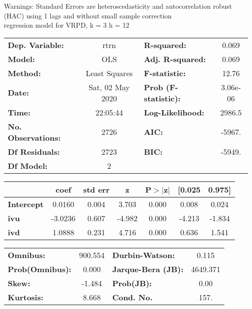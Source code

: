 Warnings: \newline
 [1] Standard Errors are heteroscedasticity and autocorrelation robust (HAC) using 1 lags and without small sample correction\\ 

regression model for VRPD, k = 3 h = 12\begin{center}
\begin{tabular}{lclc}
\toprule
\textbf{Dep. Variable:}    &       rtrn       & \textbf{  R-squared:         } &     0.069   \\
\textbf{Model:}            &       OLS        & \textbf{  Adj. R-squared:    } &     0.069   \\
\textbf{Method:}           &  Least Squares   & \textbf{  F-statistic:       } &     12.76   \\
\textbf{Date:}             & Sat, 02 May 2020 & \textbf{  Prob (F-statistic):} &  3.06e-06   \\
\textbf{Time:}             &     22:05:44     & \textbf{  Log-Likelihood:    } &    2986.5   \\
\textbf{No. Observations:} &        2726      & \textbf{  AIC:               } &    -5967.   \\
\textbf{Df Residuals:}     &        2723      & \textbf{  BIC:               } &    -5949.   \\
\textbf{Df Model:}         &           2      & \textbf{                     } &             \\
\bottomrule
\end{tabular}
\begin{tabular}{lcccccc}
                   & \textbf{coef} & \textbf{std err} & \textbf{z} & \textbf{P$> |$z$|$} & \textbf{[0.025} & \textbf{0.975]}  \\
\midrule
\textbf{Intercept} &       0.0160  &        0.004     &     3.703  &         0.000        &        0.008    &        0.024     \\
\textbf{ivu}       &      -3.0236  &        0.607     &    -4.982  &         0.000        &       -4.213    &       -1.834     \\
\textbf{ivd}       &       1.0888  &        0.231     &     4.716  &         0.000        &        0.636    &        1.541     \\
\bottomrule
\end{tabular}
\begin{tabular}{lclc}
\textbf{Omnibus:}       & 900.554 & \textbf{  Durbin-Watson:     } &    0.115  \\
\textbf{Prob(Omnibus):} &   0.000 & \textbf{  Jarque-Bera (JB):  } & 4649.371  \\
\textbf{Skew:}          &  -1.484 & \textbf{  Prob(JB):          } &     0.00  \\
\textbf{Kurtosis:}      &   8.668 & \textbf{  Cond. No.          } &     157.  \\
\bottomrule
\end{tabular}
\end{center}

